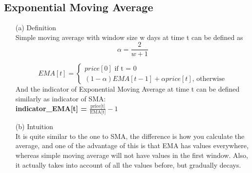 \documentclass[a4paper]{article}
\begin{document}
\subsection{Exponential Moving Average}
	\begin{itemize}
		\item[(a)] Definition \\
				Simple moving average with window size w days at time t can be defined as \\
				$$\alpha = \frac{2}{w + 1}$$

				\[
				   EMA[t]=\left\{
							   \begin{array}{ll}
								 price[0] \text{  if t = 0}\\
								 (1-\alpha)EMA[t-1] + \alpha price[t]  \text{, otherwise}
							   \end{array}
							 \right.
				 \]
				And the indicator of Exponential Moving Average at time t can be defined similarly as indicator of SMA: \\
				\textbf{indicator\_EMA[t] = $\frac{\text{price[t]}}{\text{EMA[t]}} - 1$}
		\item[(b)] Intuition \\
				It is quite similar to the one to SMA, the difference is how you calculate the average,
				and one of the advantage of this is that EMA has values everywhere, whereas
				simple moving average will not have values in the first window. Also, it actually takes
				into account of all the values before, but gradually decays.


\end{itemize}
\end{document}
